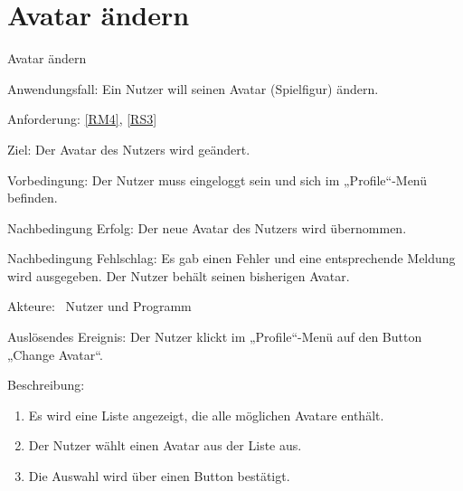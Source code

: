 \section{Avatar \"andern}
\begin{function}{70}{Avatar ändern}
\item[Anwendungsfall:] Ein Nutzer will seinen Avatar (Spielfigur) ändern.
\item[Anforderung:]\ref{RM4}, \ref{RS3}
\item[Ziel:] Der Avatar des Nutzers wird geändert.
\item[Vorbedingung:] Der Nutzer muss eingeloggt sein und sich im „Profile“-Menü befinden.
\item[Nachbedingung Erfolg:]  Der neue Avatar des Nutzers wird übernommen.
\item[Nachbedingung Fehlschlag:] Es gab einen Fehler und eine entsprechende Meldung wird ausgegeben. Der Nutzer behält seinen bisherigen Avatar.
\item[Akteure:] ~Nutzer und Programm
\item[Auslösendes Ereignis:] Der Nutzer klickt im „Profile“-Menü auf den Button „Change Avatar“.
\item[Beschreibung:] ~
\begin{enumerate}
  \item  Es wird eine Liste angezeigt, die alle möglichen Avatare enthält.
  \item  Der Nutzer wählt einen Avatar aus der Liste aus.
  \item Die Auswahl wird über einen Button bestätigt.
\end{enumerate}
\end{function}

